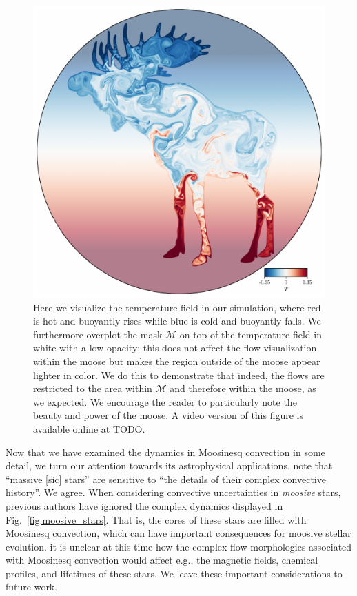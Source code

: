 \begin{figure}[tp!]
\centering
    \includegraphics[width=\textwidth]{paper_figure02.pdf}
\caption{ 
    Here we visualize the temperature field in our simulation, where red is hot and buoyantly rises while blue is cold and buoyantly falls.
    We furthermore overplot the mask $\mathcal{M}$ on top of the temperature field in white with a low opacity; this does not affect the flow visualization within the moose but makes the region outside of the moose appear lighter in color.
    We do this to demonstrate that indeed, the flows are restricted to the area within $\mathcal{M}$ and therefore within the moose, as we expected.
    We encourage the reader to particularly note the beauty and power of the moose.
    A video version of this figure is available online at TODO.
\label{fig:dynamics}
}
\end{figure}

Now that we have examined the dynamics in Moosinesq convection in some detail, we turn our attention towards its astrophysical applications.
\citet{kaiser_etal_2020} note that ``massive [sic] stars'' are sensitive to ``the details of their complex convective history''.
We agree.
When considering convective uncertainties in \emph{moosive} stars, previous authors have ignored the complex dynamics displayed in Fig.~\ref{fig:moosive_stars}.
That is, the cores of these stars are filled with Moosinesq convection, which can have important consequences for moosive stellar evolution.
it is unclear at this time how the complex flow morphologies associated with Moosinesq convection would affect e.g., the magnetic fields, chemical profiles, and lifetimes of these stars.
We leave these important considerations to future work.

